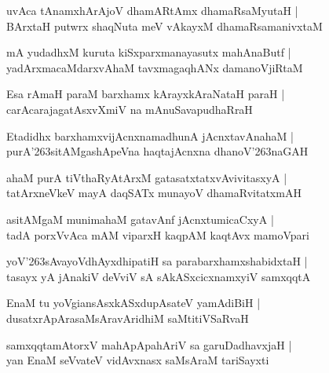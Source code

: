 \documentclass[twoside,12pt,openright]{book}
\def\S{\char'263}
\newcounter{shloka}[chapter]
\begin{document}
\begin{shloka}%
uvAca tAnamxhArAjoV dhamARtAmx dhamaRsaMyutaH |\\
BArxtaH putwrx shaqNuta meV vAkayxM dhamaRsamanivxtaM 
\end{shloka}

\begin{shloka}%
mA yudadhxM kuruta kiSxparxmanayasutx mahAnaButf |\\
yadArxmacaMdarxvAhaM tavxmagaqhANx damanoVjiRtaM 
\end{shloka}

\begin{shloka}%
Esa rAmaH paraM barxhamx kArayxkAraNataH paraH |\\
carAcarajagatAsxvXmiV na mAnuSavapudhaRraH
\end{shloka}

\begin{shloka}%
Etadidhx barxhamxvijAcnxnamadhunA jAcnxtavAnahaM |\\
purA\S sitAMgashApeVna  haqtajAcnxna dhanoV\S naGAH 
\end{shloka}

\begin{shloka}%
ahaM purA tiVthaRyAtArxM gatasatxtatxvAvivitasxyA |\\
tatArxneVkeV mayA daqSATx munayoV dhamaRvitatxmAH 
\end{shloka}

\begin{shloka}%
asitAMgaM munimahaM gatavAnf jAcnxtumicaCxyA |\\
tadA porxVvAca mAM viparxH kaqpAM kaqtAvx mamoVpari
\end{shloka}

\begin{shloka}%
yoV\S sAvayoVdhAyxdhipatiH sa parabarxhamxshabidxtaH |\\
tasayx yA jAnakiV deVviV sA sAkASxcicxnamxyiV samxqqtA 
\end{shloka}

\begin{shloka}%
EnaM tu yoVgiansAsxkASxdupAsateV yamAdiBiH |\\
dusatxrApArasaMsAravAridhiM saMtitiVSaRvaH
\end{shloka}

\begin{shloka}%
samxqqtamAtorxV mahApApahAriV sa garuDadhavxjaH |\\
yan EnaM seVvateV vidAvxnasx saMsAraM tariSayxti
\end{shloka}
\end{document}
